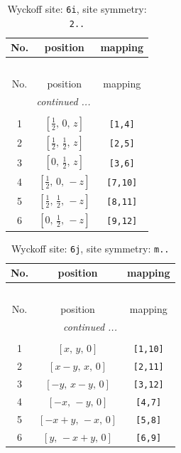 \documentclass[fleqn,8pt]{jsarticle}
\begin{document}
\renewcommand{\arraystretch}{1.2}
\begin{longtable}{ccc}
\caption{Wyckoff site: {\tt 6i}, site symmetry: {\tt 2..}}
 \\
 \hline \hline
No. & position & mapping \\ \hline \endfirsthead

\multicolumn{2}{l}{\tablename\ \thetable{}} \\
 \hline \hline
No. & position & mapping \\ \hline \endhead

 \hline \hline
\multicolumn{2}{r}{\footnotesize\it continued ...} \\ \endfoot

 \hline \hline
\multicolumn{2}{r}{} \\ \endlastfoot

1 & $\left[ \frac{1}{2},\, 0,\, z \right]$ & {\tt [1,4]} \\ \hline
2 & $\left[ \frac{1}{2},\, \frac{1}{2},\, z \right]$ & {\tt [2,5]} \\ \hline
3 & $\left[ 0,\, \frac{1}{2},\, z \right]$ & {\tt [3,6]} \\ \hline
4 & $\left[ \frac{1}{2},\, 0,\, - z \right]$ & {\tt [7,10]} \\ \hline
5 & $\left[ \frac{1}{2},\, \frac{1}{2},\, - z \right]$ & {\tt [8,11]} \\ \hline
6 & $\left[ 0,\, \frac{1}{2},\, - z \right]$ & {\tt [9,12]} \\
\end{longtable}
\renewcommand{\arraystretch}{1.2}
\begin{longtable}{ccc}
\caption{Wyckoff site: {\tt 6j}, site symmetry: {\tt m..}}
 \\
 \hline \hline
No. & position & mapping \\ \hline \endfirsthead

\multicolumn{2}{l}{\tablename\ \thetable{}} \\
 \hline \hline
No. & position & mapping \\ \hline \endhead

 \hline \hline
\multicolumn{2}{r}{\footnotesize\it continued ...} \\ \endfoot

 \hline \hline
\multicolumn{2}{r}{} \\ \endlastfoot

1 & $\left[ x,\, y,\, 0 \right]$ & {\tt [1,10]} \\ \hline
2 & $\left[ x - y,\, x,\, 0 \right]$ & {\tt [2,11]} \\ \hline
3 & $\left[ - y,\, x - y,\, 0 \right]$ & {\tt [3,12]} \\ \hline
4 & $\left[ - x,\, - y,\, 0 \right]$ & {\tt [4,7]} \\ \hline
5 & $\left[ - x + y,\, - x,\, 0 \right]$ & {\tt [5,8]} \\ \hline
6 & $\left[ y,\, - x + y,\, 0 \right]$ & {\tt [6,9]} \\
\end{longtable}
\end{document}
